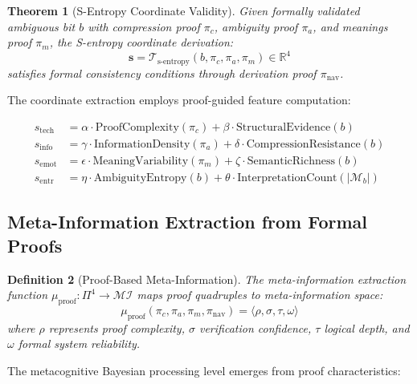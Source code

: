 \documentclass[11pt,a4paper]{article}
\newtheorem{theorem}{Theorem}[section]
\newtheorem{definition}[theorem]{Definition}
\begin{document}
\begin{theorem}[S-Entropy Coordinate Validity]
Given formally validated ambiguous bit $b$ with compression proof $\pi_c$, ambiguity proof $\pi_a$, and meanings proof $\pi_m$, the S-entropy coordinate derivation:
\begin{equation}
\mathbf{s} = \mathcal{T}_{\text{s-entropy}}(b, \pi_c, \pi_a, \pi_m) \in \mathbb{R}^4
\label{eq:s-entropy-derivation}
\end{equation}
satisfies formal consistency conditions through derivation proof $\pi_{\text{nav}}$.
\end{theorem}

The coordinate extraction employs proof-guided feature computation:

\begin{align}
s_{\text{tech}} &= \alpha \cdot \text{ProofComplexity}(\pi_c) + \beta \cdot \text{StructuralEvidence}(b) \label{eq:tech-coordinate}\\
s_{\text{info}} &= \gamma \cdot \text{InformationDensity}(\pi_a) + \delta \cdot \text{CompressionResistance}(b) \label{eq:info-coordinate}\\
s_{\text{emot}} &= \epsilon \cdot \text{MeaningVariability}(\pi_m) + \zeta \cdot \text{SemanticRichness}(b) \label{eq:emot-coordinate}\\
s_{\text{entr}} &= \eta \cdot \text{AmbiguityEntropy}(b) + \theta \cdot \text{InterpretationCount}(|\mathcal{M}_b|) \label{eq:entr-coordinate}
\end{align}

\subsection{Meta-Information Extraction from Formal Proofs}

\begin{definition}[Proof-Based Meta-Information]
The meta-information extraction function $\mu_{\text{proof}}: \Pi^4 \to \mathcal{MI}$ maps proof quadruples to meta-information space:
\begin{equation}
\mu_{\text{proof}}(\pi_c, \pi_a, \pi_m, \pi_{\text{nav}}) = \langle \rho, \sigma, \tau, \omega \rangle
\label{eq:proof-meta-info}
\end{equation}
where $\rho$ represents proof complexity, $\sigma$ verification confidence, $\tau$ logical depth, and $\omega$ formal system reliability.
\end{definition}

The metacognitive Bayesian processing level emerges from proof characteristics:
\end{document}
